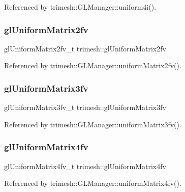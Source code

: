 Referenced by trimesh\+::\+G\+L\+Manager\+::uniform4i().

\mbox{\label{namespacetrimesh_aae6a81d4bd65aee0d4d11779d347afc2}} 
\subsubsection{\texorpdfstring{gl\+Uniform\+Matrix2fv}{glUniformMatrix2fv}}
{\footnotesize\ttfamily gl\+Uniform\+Matrix2fv\+\_\+t trimesh\+::gl\+Uniform\+Matrix2fv\hspace{0.3cm}{\ttfamily [static]}}



Referenced by trimesh\+::\+G\+L\+Manager\+::uniform\+Matrix2fv().

\mbox{\label{namespacetrimesh_a3f0fdb93ca33339f92c4bf8d7d53b15f}} 
\subsubsection{\texorpdfstring{gl\+Uniform\+Matrix3fv}{glUniformMatrix3fv}}
{\footnotesize\ttfamily gl\+Uniform\+Matrix3fv\+\_\+t trimesh\+::gl\+Uniform\+Matrix3fv\hspace{0.3cm}{\ttfamily [static]}}



Referenced by trimesh\+::\+G\+L\+Manager\+::uniform\+Matrix3fv().

\mbox{\label{namespacetrimesh_a6c258d9116c5c1bf56e1e7e4f3deea77}} 
\subsubsection{\texorpdfstring{gl\+Uniform\+Matrix4fv}{glUniformMatrix4fv}}
{\footnotesize\ttfamily gl\+Uniform\+Matrix4fv\+\_\+t trimesh\+::gl\+Uniform\+Matrix4fv\hspace{0.3cm}{\ttfamily [static]}}



Referenced by trimesh\+::\+G\+L\+Manager\+::uniform\+Matrix4fv().

